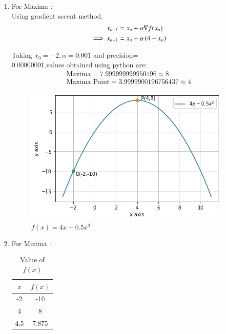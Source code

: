 \begin{enumerate}
    \item For Maxima : \\
    Using gradient ascent method,
    \begin{align}
        x_{n+1} &= x_n + \alpha \nabla f(x_n) \\
        \implies x_{n+1} &= x_n + \alpha \left(4-x_n\right)
    \end{align}
    
    Taking $x_0=-2,\alpha=0.001$ and precision= \\ 0.00000001,values obtained using python are:
    \begin{align}
        \boxed{\text{Maxima} = 7.999999999950196 \approx 8 }\\
        \boxed{\text{Maxima Point} = 3.9999900196756437 \approx 4}
    \end{align}
    
    
    \begin{figure}[!ht]
    \centering
    \includegraphics[width=\columnwidth]{solutions/su2021/2/1/a/Figure15.png}
    \caption{$f(x)=4x-0.5x^2$}
    \label{opt/2/1/a/f(x)}	
    \end{figure}

    \item For Minima : \\
    
    \begin{table}[!ht]
    \centering
    \begin{tabular}{|c|c|} 
    \hline
    $x$ & $f(x)$ \\
    \hline
    -2 & -10 \\
    \hline
    4 & 8 \\
    \hline
    4.5 & 7.875 \\
    \hline
    \end{tabular}
    \caption{Value of $f(x)$}
    \label{opt/2/1/a/tab:table1}
    \end{table}
    

\end{enumerate}
